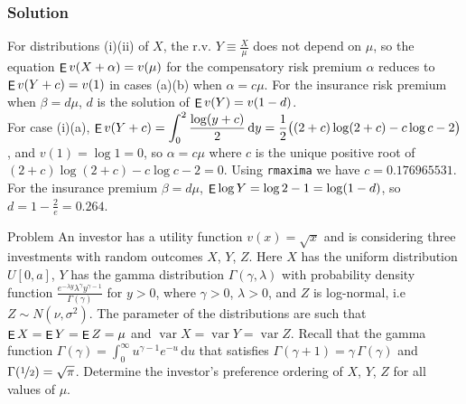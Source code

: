 \documentclass[10pt]{beamer}
\newcommand{\ds}{\displaystyle}
\DeclareMathOperator\expc{{\sf E}}
\DeclareMathOperator\var{var}
\theoremstyle{definition}
\begin{document}
\begin{frame}[allowframebreaks]
  \frametitle{Solution}
  For distributions (i)(ii) of $X$, the r.v. $\ds Y\equiv\frac{X}{\mu}$ does not depend on $\mu$, so the equation $\ds\expc v(X + \alpha) = v(\mu)$ for the compensatory risk premium $\alpha$ reduces to $\ds\expc v(Y + c) = v(1)$ in cases (a)(b) when $\alpha=c\mu$. For the insurance risk premium when $\beta = d\mu$, $d$ is the solution of $\expc v(Y) = v(1 - d)$.\\
  For case (i)(a), $\ds\expc v(Y + c) = \int_0^2\frac{\log(y + c)}{2}\,\text{d}y = \frac{1}{2}\big((2 + c)\log(2 + c) - c\log c - 2\big)$, and $v(1) = \log 1 = 0$, so $\alpha = c\mu$ where $c$ is the unique positive root of $(2 + c)\log(2 + c) - c\log c - 2 = 0$. Using {\tt rmaxima}
  we have $c = 0.176965531$. For the insurance premium $\beta = d\mu$, $\ds\expc\log Y = \log 2 - 1 = \log(1 - d)$, so $\ds d = 1 - \frac{2}{e} = 0.264$.
\end{frame}

\begin{frame}{Problem}
  An investor has a utility function $v(x) = \sqrt{x}$ and is considering three investments with random outcomes $X$, $Y$, $Z$. Here $X$ has the uniform distribution $U[0, a]$, $Y$ has the gamma distribution $\Gamma(\gamma,\lambda)$ with probability density function $\ds\frac{e^{-\lambda y}\lambda^\gamma y^{\gamma - 1}}{\Gamma(\gamma)}$ for $y > 0$, where $\gamma > 0$, $\lambda > 0$, and $Z$ is log-normal, i.e $Z\sim N(\nu, \sigma^2)$. The parameter of the distributions are such that $\expc X = \expc Y = \expc Z = \mu$ and $\var X = \var Y = \var Z$. Recall that the gamma function $\ds\Gamma(\gamma) = \int_0^\infty u^{\gamma - 1} e^{-u}\,\text{d}u$ that satisfies $\Gamma(\gamma + 1) = \gamma\,\Gamma(\gamma)$ and $\Gamma(\nicefrac{1}{2}) = \sqrt{\pi}$. Determine the investor's preference ordering of $X$, $Y$, $Z$ for all values of $\mu$.
\end{frame}
\end{document}
